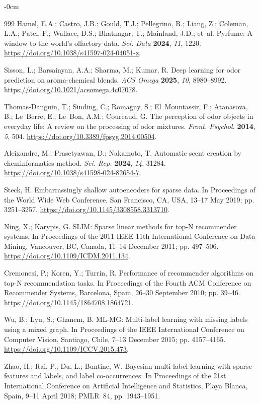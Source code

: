 \documentclass[applsci,article,submit,oneauthor]{Definitions/mdpi}
\begin{document}
\begin{adjustwidth}{-\extralength}{0cm}
\begin{thebibliography}{999}
 Hamel, E.A.; Castro, J.B.; Gould, T.J.; Pellegrino, R.; Liang, Z.; Coleman, L.A.; Patel, F.; Wallace, D.S.; Bhatnagar, T.; Mainland, J.D.; et~al. Pyrfume: A window to the world's olfactory data. \emph{Sci. Data} \textbf{2024}, \emph{11}, 1220. \url{https://doi.org/10.1038/s41597-024-04051-z}.

 Sisson, L.; Barsainyan, A.A.; Sharma, M.; Kumar, R. Deep learning for odor prediction on aroma-chemical blends. \emph{ACS Omega} \textbf{2025}, \emph{10}, 8980--8992. \url{https://doi.org/10.1021/acsomega.4c07078}.

 Thomas-Danguin, T.; Sinding, C.; Romagny, S.; El~Mountassir, F.; Atanasova, B.; Le~Berre, E.; Le~Bon, A.M.; Coureaud, G. The perception of odor objects in everyday life: A review on the processing of odor mixtures. \emph{Front. Psychol.} \textbf{2014}, \emph{5}, 504. \url{https://doi.org/10.3389/fpsyg.2014.00504}.

 Aleixandre, M.; Prasetyawan, D.; Nakamoto, T. Automatic scent creation by cheminformatics method. \emph{Sci. Rep.} \textbf{2024}, \emph{14}, 31284. \url{https://doi.org/10.1038/s41598-024-82654-7}.

 Steck, H. Embarrassingly shallow autoencoders for sparse data. In Proceedings of the World Wide Web Conference, San Francisco, CA, USA, 13--17 May 2019; pp. 3251--3257. \url{https://doi.org/10.1145/3308558.3313710}.

 Ning, X.; Karypis, G. SLIM: Sparse linear methods for top-N recommender systems. In Proceedings of the 2011 IEEE 11th International Conference on Data Mining, Vancouver, BC, Canada, 11--14 December 2011; pp. 497--506. \url{https://doi.org/10.1109/ICDM.2011.134}.

 Cremonesi, P.; Koren, Y.; Turrin, R. Performance of recommender algorithms on top-N recommendation tasks. In Proceedings of the Fourth ACM Conference on Recommender Systems, Barcelona, Spain, 26--30 September 2010; pp. 39--46. \url{https://doi.org/10.1145/1864708.1864721}.

 Wu, B.; Lyu, S.; Ghanem, B. ML-MG: Multi-label learning with missing labels using a mixed graph. In Proceedings of the IEEE International Conference on Computer Vision, Santiago, Chile, 7--13 December 2015; pp. 4157--4165. \url{https://doi.org/10.1109/ICCV.2015.473}.

 Zhao, H.; Rai, P.; Du, L.; Buntine, W. Bayesian multi-label learning with sparse features and labels, and label co-occurrences. In Proceedings of the 21st International Conference on Artificial Intelligence and Statistics, Playa Blanca, Spain, 9--11 April 2018; PMLR~84, pp. 1943--1951.


\end{thebibliography}
\end{adjustwidth}
\end{document}
